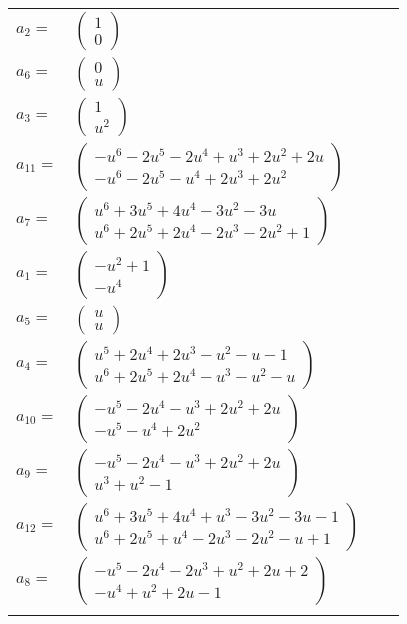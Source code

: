 \documentclass[1p]{elsarticle_modified}
\theoremstyle{definition}
\begin{document}
\begin{tabular}{m{7pt} m{180pt} m{7pt} m{180pt} }
\flushright $a_{2}=$&$\begin{pmatrix}1\\0\end{pmatrix}$ \\
\flushright $a_{6}=$&$\begin{pmatrix}0\\u\end{pmatrix}$ \\
\flushright $a_{3}=$&$\begin{pmatrix}1\\u^2\end{pmatrix}$ \\
\flushright $a_{11}=$&$\begin{pmatrix}- u^6-2 u^5-2 u^4+u^3+2 u^2+2 u\\- u^6-2 u^5- u^4+2 u^3+2 u^2\end{pmatrix}$ \\
\flushright $a_{7}=$&$\begin{pmatrix}u^6+3 u^5+4 u^4-3 u^2-3 u\\u^6+2 u^5+2 u^4-2 u^3-2 u^2+1\end{pmatrix}$ \\
\flushright $a_{1}=$&$\begin{pmatrix}- u^2+1\\- u^4\end{pmatrix}$ \\
\flushright $a_{5}=$&$\begin{pmatrix}u\\u\end{pmatrix}$ \\
\flushright $a_{4}=$&$\begin{pmatrix}u^5+2 u^4+2 u^3- u^2- u-1\\u^6+2 u^5+2 u^4- u^3- u^2- u\end{pmatrix}$ \\
\flushright $a_{10}=$&$\begin{pmatrix}- u^5-2 u^4- u^3+2 u^2+2 u\\- u^5- u^4+2 u^2\end{pmatrix}$ \\
\flushright $a_{9}=$&$\begin{pmatrix}- u^5-2 u^4- u^3+2 u^2+2 u\\u^3+u^2-1\end{pmatrix}$ \\
\flushright $a_{12}=$&$\begin{pmatrix}u^6+3 u^5+4 u^4+u^3-3 u^2-3 u-1\\u^6+2 u^5+u^4-2 u^3-2 u^2- u+1\end{pmatrix}$ \\
\flushright $a_{8}=$&$\begin{pmatrix}- u^5-2 u^4-2 u^3+u^2+2 u+2\\- u^4+u^2+2 u-1\end{pmatrix}$\\&\end{tabular}
\end{document}
